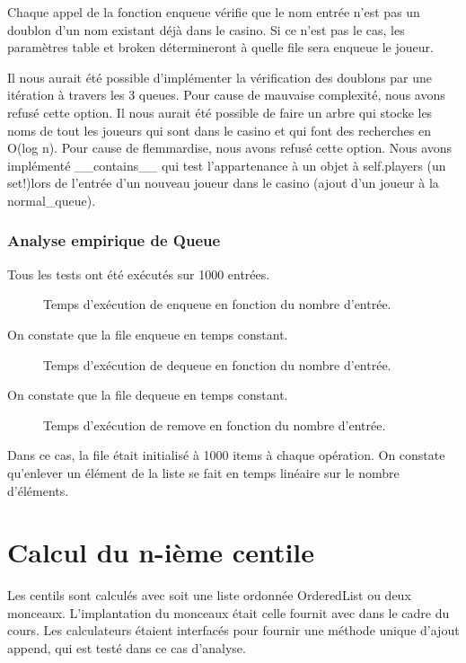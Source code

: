 \documentclass[french]{article}
\begin{document}
Chaque appel de la fonction enqueue vérifie que le nom entrée n'est pas un
doublon d'un nom existant déjà dans le casino. Si ce n'est pas le cas, les
paramètres table et broken détermineront à quelle file sera enqueue le joueur.

Il nous aurait été possible d'implémenter la vérification des doublons par une
itération à travers les 3 queues. Pour cause de mauvaise complexité, nous
avons refusé cette option. Il nous aurait été possible de faire un arbre qui
stocke les noms de tout les joueurs qui sont dans le casino et qui font des
recherches en O(log n). Pour cause de flemmardise, nous avons refusé cette
option. Nous avons implémenté \textsf{\_\_contains\_\_} qui test l'appartenance à un
objet à self.players (un set!)lors de l'entrée d'un nouveau joueur dans le
casino (ajout d'un joueur à la normal\_queue).

\subsubsection{Analyse empirique de \textsf{Queue}}
Tous les tests ont été exécutés sur 1000 entrées.

\begin{figure}
  \centering
  
  \caption{Temps d'exécution de \textsf{enqueue} en fonction du nombre d'entrée.}
\end{figure}
On constate que la file enqueue en temps constant.

\begin{figure}
  
\caption{Temps d'exécution de \textsf{dequeue} en fonction du nombre d'entrée.}
\end{figure}
On constate que la file dequeue en temps constant.

\begin{figure}
  
  \caption{Temps d'exécution de \textsf{remove} en fonction du nombre d'entrée.}
\end{figure}
Dans ce cas, la file était initialisé à 1000 items à chaque opération. On
constate qu'enlever un élément de la liste se fait en temps linéaire sur le
nombre d'éléments.

\section{Calcul du n-ième centile}
Les centils sont calculés avec soit une liste ordonnée \textsf{OrderedList} ou
deux monceaux. L'implantation du monceaux était celle fournit avec dans le cadre
du cours. Les calculateurs étaient interfacés pour fournir une méthode unique
d'ajout \textsf{append}, qui est testé dans ce cas d'analyse.
\end{document}
